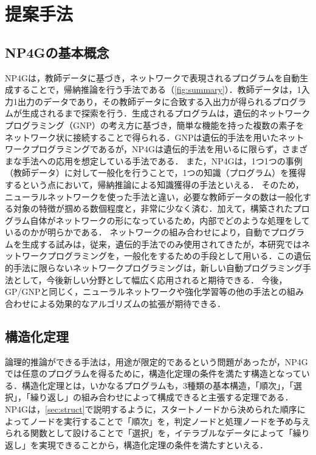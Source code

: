 \documentclass[exploratorypaper]{jsaiart} %
\begin{document}
\section{提案手法}
\subsection{NP4Gの基本概念}
NP4Gは，教師データに基づき，ネットワークで表現されるプログラムを自動生成することで，帰納推論を行う手法である（\ref{fig:summary}）．教師データは，1入力1出力のデータであり，その教師データに合致する入出力が得られるプログラムが生成されるまで探索を行う．生成されるプログラムは，遺伝的ネットワークプログラミング（GNP）の考え方に基づき，簡単な機能を持った複数の素子をネットワーク状に接続することで得られる．GNPは遺伝的手法を用いたネットワークプログラミングであるが，NP4Gは遺伝的手法を用いるに限らず，さまざまな手法への応用を想定している手法である．
また，NP4Gは，1つ1つの事例（教師データ）に対して一般化を行うことで，1つの知識（プログラム）を獲得するという点において，帰納推論による知識獲得の手法といえる．
そのため，ニューラルネットワークを使った手法と違い，必要な教師データの数は一般化する対象の特徴が掴める数個程度と，非常に少なく済む．加えて，構築されたプログラム自体がネットワークの形になっているため，内部でどのような処理をしているのかが明らかである．
ネットワークの組み合わせにより，自動でプログラムを生成する試みは，従来，遺伝的手法でのみ使用されてきたが，本研究ではネットワークプログラミングを，一般化をするための手段として用いる．この遺伝的手法に限らないネットワークプログラミングは，新しい自動プログラミング手法として，今後新しい分野として幅広く応用されると期待できる．
今後，GP/GNPと同じく，ニューラルネットワークや強化学習等の他の手法との組み合わせによる効果的なアルゴリズムの拡張が期待できる．
\subsection{構造化定理}
論理的推論ができる手法は，用途が限定的であるという問題があったが，NP4Gでは任意のプログラムを得るために，構造化定理の条件を満たす構造となっている．構造化定理とは，いかなるプログラムも，3種類の基本構造，「順次」，「選択」，「繰り返し」の組み合わせによって構成できると主張する定理である\cite{StructuredProgramming}．NP4Gは，\ref{sec:struct}で説明するように，スタートノードから決められた順序によってノードを実行することで「順次」を，判定ノードと処理ノードを予め与えられる関数として設けることで「選択」を，イテラブルなデータによって「繰り返し」を実現できることから，構造化定理の条件を満たすといえる．
\end{document}
